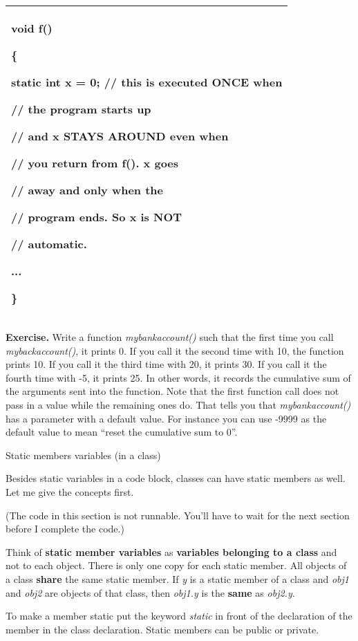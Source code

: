 \documentclass[
]{article}
\begin{document}
\begin{longtable}[]{@{}l@{}}
\toprule
\endhead
\begin{minipage}[t]{0.97\columnwidth}\raggedright
void f()

\{

static int x = 0; // this is executed ONCE when

// the program starts up

// and x STAYS AROUND even when

// you return from f(). x goes

// away and only when the

// program ends. So x is NOT

// automatic.

...

\}\strut
\end{minipage}\tabularnewline
\bottomrule
\end{longtable}

\textbf{Exercise.} Write a function \emph{mybankaccount()} such that the
first time you call \emph{mybackaccount()}, it prints 0. If you call it
the second time with 10, the function prints 10. If you call it the
third time with 20, it prints 30. If you call it the fourth time with
-5, it prints 25. In other words, it records the cumulative sum of the
arguments sent into the function. Note that the first function call does
not pass in a value while the remaining ones do. That tells you that
\emph{mybankaccount()} has a parameter with a default value. For
instance you can use -9999 as the default value to mean ``reset the
cumulative sum to 0''.

Static members variables (in a class)

Besides static variables in a code block, classes can have static
members as well. Let me give the concepts first.

(The code in this section is not runnable. You'll have to wait for the
next section before I complete the code.)

Think of \textbf{static member variables} as \textbf{variables belonging
to a class} and not to each object. There is only one copy for each
static member. All objects of a class \textbf{share} the same static
member. If \emph{y} is a static member of a class and \emph{obj1} and
\emph{obj2 }are objects of that class, then \emph{obj1.y} is the
\textbf{same} as \emph{obj2.y}.

To make a member static put the keyword \emph{static} in front of the
declaration of the member in the class declaration. Static members can
be public or private.
\end{document}
